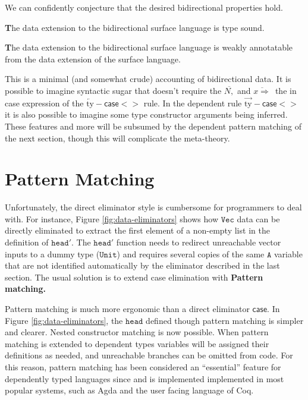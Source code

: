 We can confidently conjecture that the desired bidirectional properties
hold.
\begin{conjecture}
\textbf{T}he data extension to the bidirectional surface language
is type sound.
\end{conjecture}

\begin{conjecture}
\textbf{T}he data extension to the bidirectional surface language
is weakly annotatable from the data extension of the surface language.
\end{conjecture}

This is a minimal (and somewhat crude) accounting of bidirectional
data. It is possible to imagine syntactic sugar that doesn't require
the $\overline{N,}$ and $\overline{x\Rightarrow}\,$ the in case
expression of the $\operatorname{\overleftarrow{ty}-}\mathsf{case}<>$
rule. In the dependent rule $\operatorname{\overrightarrow{ty}-}\mathsf{case}<>$
it is also possible to imagine some type constructor arguments being
inferred. These features and more will be subsumed by the dependent
pattern matching of the next section, though this will complicate
the meta-theory.

\section{Pattern Matching}

Unfortunately, the direct eliminator style is cumbersome for programmers
to deal with. For instance, Figure \ref{fig:data-eliminators} shows
how $\mathtt{Vec}$ data can be directly eliminated to extract the
first element of a non-empty list in the definition of $\mathtt{head'}$.
The $\mathtt{head'}$ function needs to redirect unreachable vector
inputs to a dummy type ($\mathtt{Unit}$) and requires several copies
of the same $\mathtt{A}$ variable that are not identified automatically
by the eliminator described in the last section. The usual solution
is to extend case elimination with \textbf{Pattern matching.}

Pattern matching is much more ergonomic than a direct eliminator $\mathsf{case}$.
In Figure \ref{fig:data-eliminators}, the $\mathtt{head}$ defined
though pattern matching is simpler and clearer. Nested constructor
matching is now possible. When pattern matching is extended to dependent
types variables will be assigned their definitions as needed, and
unreachable branches can be omitted from code. For this reason, pattern
matching has been considered an ``essential'' feature for dependently
typed languages since \cite{coquand1992pattern} and is implemented
implemented in most popular systems, such as Agda and the user facing
language of Coq.

